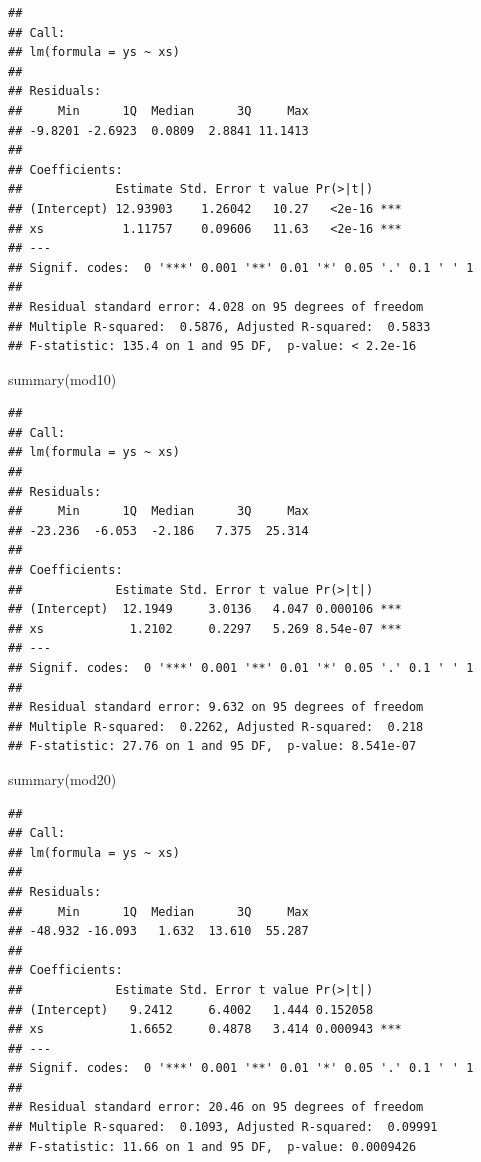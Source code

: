 \documentclass[
]{book}
\newenvironment{Shaded}{\begin{snugshade}}{\end{snugshade}}
\newcommand{\FunctionTok}[1]{\textcolor[rgb]{0.00,0.00,0.00}{#1}}
\newcommand{\NormalTok}[1]{#1}
\begin{document}
\begin{verbatim}
## 
## Call:
## lm(formula = ys ~ xs)
## 
## Residuals:
##     Min      1Q  Median      3Q     Max 
## -9.8201 -2.6923  0.0809  2.8841 11.1413 
## 
## Coefficients:
##             Estimate Std. Error t value Pr(>|t|)    
## (Intercept) 12.93903    1.26042   10.27   <2e-16 ***
## xs           1.11757    0.09606   11.63   <2e-16 ***
## ---
## Signif. codes:  0 '***' 0.001 '**' 0.01 '*' 0.05 '.' 0.1 ' ' 1
## 
## Residual standard error: 4.028 on 95 degrees of freedom
## Multiple R-squared:  0.5876, Adjusted R-squared:  0.5833 
## F-statistic: 135.4 on 1 and 95 DF,  p-value: < 2.2e-16
\end{verbatim}

\begin{Shaded}
\begin{Highlighting}[]
\FunctionTok{summary}\NormalTok{(mod10)}
\end{Highlighting}
\end{Shaded}

\begin{verbatim}
## 
## Call:
## lm(formula = ys ~ xs)
## 
## Residuals:
##     Min      1Q  Median      3Q     Max 
## -23.236  -6.053  -2.186   7.375  25.314 
## 
## Coefficients:
##             Estimate Std. Error t value Pr(>|t|)    
## (Intercept)  12.1949     3.0136   4.047 0.000106 ***
## xs            1.2102     0.2297   5.269 8.54e-07 ***
## ---
## Signif. codes:  0 '***' 0.001 '**' 0.01 '*' 0.05 '.' 0.1 ' ' 1
## 
## Residual standard error: 9.632 on 95 degrees of freedom
## Multiple R-squared:  0.2262, Adjusted R-squared:  0.218 
## F-statistic: 27.76 on 1 and 95 DF,  p-value: 8.541e-07
\end{verbatim}

\begin{Shaded}
\begin{Highlighting}[]
\FunctionTok{summary}\NormalTok{(mod20)}
\end{Highlighting}
\end{Shaded}

\begin{verbatim}
## 
## Call:
## lm(formula = ys ~ xs)
## 
## Residuals:
##     Min      1Q  Median      3Q     Max 
## -48.932 -16.093   1.632  13.610  55.287 
## 
## Coefficients:
##             Estimate Std. Error t value Pr(>|t|)    
## (Intercept)   9.2412     6.4002   1.444 0.152058    
## xs            1.6652     0.4878   3.414 0.000943 ***
## ---
## Signif. codes:  0 '***' 0.001 '**' 0.01 '*' 0.05 '.' 0.1 ' ' 1
## 
## Residual standard error: 20.46 on 95 degrees of freedom
## Multiple R-squared:  0.1093, Adjusted R-squared:  0.09991 
## F-statistic: 11.66 on 1 and 95 DF,  p-value: 0.0009426
\end{verbatim}
\end{document}

